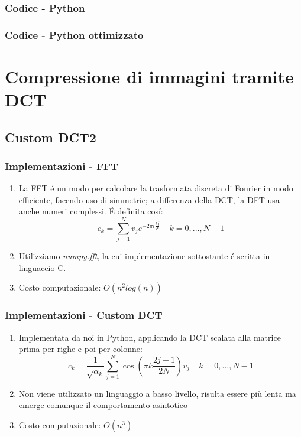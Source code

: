 \documentclass{beamer}
\begin{document}
\begin{frame}
	\frametitle{Codice - Python}
	
\end{frame}


\begin{frame}
	\frametitle{Codice - Python ottimizzato}
	
\end{frame}

\section{Compressione di immagini tramite DCT}

\subsection{Custom DCT2}

\begin{frame}
\frametitle{Implementazioni - FFT}
\begin{enumerate}
\item La FFT \'e un modo per calcolare la trasformata discreta di Fourier in modo efficiente, facendo uso di simmetrie; a differenza della DCT, la DFT usa anche numeri complessi. \'E definita cos\'i:
\[c_k = \sum\limits_{j = 1}^N v_j e^{-2 \pi i \frac{kj}{N}} \;\;\;\; k = 0,...,N-1\]
\item Utilizziamo \textit{numpy.fft}, la cui implementazione sottostante \'e scritta in linguaccio C.
\item Costo computazionale: $O(n^2log(n))$
\end{enumerate}
\end{frame}
\begin{frame}
\frametitle{Implementazioni - Custom DCT}
\begin{enumerate}
\item Implementata da noi in Python, applicando la DCT scalata alla matrice prima per righe e poi per colonne:
\[c_k = \frac{1}{\sqrt{\alpha_k}} \sum\limits_{j=1}^N \cos(\pi k \frac{2j - 1}{2N}) v_j \;\;\;\; k = 0,...,N-1\]
\item Non viene utilizzato un linguaggio a basso livello, risulta essere più lenta ma emerge comunque il comportamento asintotico
\item Costo computazionale: $O(n^3)$
\end{enumerate}
\end{frame}
\end{document}
